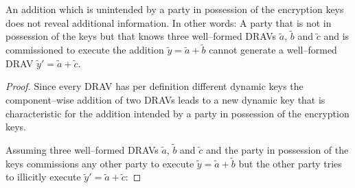 \begin{lem}
  \label{lem:wrong-add}

  An addition which is unintended by a party in possession of the encryption
  keys does not reveal additional information. In other words: A party that is
  not in possession of the keys but that knows three well--formed DRAVs
  $\widetilde{a}$, $\widetilde{b}$ and $\widetilde{c}$ and is commissioned to
  execute the addition $\widetilde{y} = \widetilde{a} + \widetilde{b}$ cannot
  generate a well--formed DRAV $\widetilde{y}' = \widetilde{a} + \widetilde{c}$.

\end{lem}

\begin{proof}

  Since every DRAV has per definition different dynamic keys the
  component--wise addition of two DRAVs leads to a new dynamic key that is
  characteristic for the addition intended by a party in possession of the
  encryption keys.

  Assuming three well--formed DRAVs $\widetilde{a}$, $\widetilde{b}$ and
  $\widetilde{c}$ and the party in possession of the keys commissions any other
  party to execute $\widetilde{y} = \widetilde{a} + \widetilde{b}$ but the other
  party tries to illicitly execute $\widetilde{y}' = \widetilde{a} +
  \widetilde{c}$:


\end{proof}
